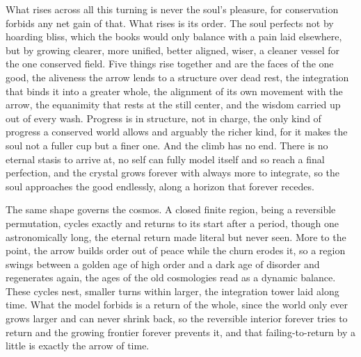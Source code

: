 What rises across all this turning is never the soul's pleasure, for conservation forbids any net gain of that. What rises is its order. The soul perfects not by hoarding bliss, which the books would only balance with a pain laid elsewhere, but by growing clearer, more unified, better aligned, wiser, a cleaner vessel for the one conserved field. Five things rise together and are the faces of the one good, the aliveness the arrow lends to a structure over dead rest, the integration that binds it into a greater whole, the alignment of its own movement with the arrow, the equanimity that rests at the still center, and the wisdom carried up out of every wash. Progress is in structure, not in charge, the only kind of progress a conserved world allows and arguably the richer kind, for it makes the soul not a fuller cup but a finer one. And the climb has no end. There is no eternal stasis to arrive at, no self can fully model itself and so reach a final perfection, and the crystal grows forever with always more to integrate, so the soul approaches the good endlessly, along a horizon that forever recedes.

The same shape governs the cosmos. A closed finite region, being a reversible permutation, cycles exactly and returns to its start after a period, though one astronomically long, the eternal return made literal but never seen. More to the point, the arrow builds order out of peace while the churn erodes it, so a region swings between a golden age of high order and a dark age of disorder and regenerates again, the ages of the old cosmologies read as a dynamic balance. These cycles nest, smaller turns within larger, the integration tower laid along time. What the model forbids is a return of the whole, since the world only ever grows larger and can never shrink back, so the reversible interior forever tries to return and the growing frontier forever prevents it, and that failing-to-return by a little is exactly the arrow of time.
